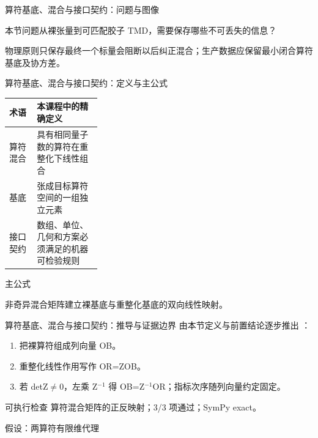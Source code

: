 \begin{frame}[t]{算符基底、混合与接口契约：问题与图像}
\footnotesize
\begin{block}{本节问题}从裸张量到可匹配胶子 TMD，需要保存哪些不可丢失的信息？\end{block}
\begin{block}{物理原则}\quad 只保存最终一个标量会阻断以后纠正混合；生产数据应保留最小闭合算符基底及协方差。\end{block}
\end{frame}

\begin{frame}[t]{算符基底、混合与接口契约：定义与主公式}
\footnotesize\begin{tabularx}{\linewidth}{p{0.30\linewidth}Y}
\toprule 术语 & 本课程中的精确定义\\\midrule
{} 算符混合 & 具有相同量子数的算符在重整化下线性组合\\
 基底 & 张成目标算符空间的一组独立元素\\
 接口契约 & 数组、单位、几何和方案必须满足的机器可检验规则\\
\bottomrule\end{tabularx}\vspace{0.15cm}
\begin{block}{ 主公式}\centering{}\end{block}
非奇异混合矩阵建立裸基底与重整化基底的双向线性映射。
\end{frame}

\begin{frame}[t]{算符基底、混合与接口契约：推导与证据边界}
\footnotesize
{}\quad 由本节定义与前置结论逐步推出 ：
\begin{enumerate}
\item 把裸算符组成列向量 OB。
\item 重整化线性作用写作 OR=ZOB。
\item 若 detZ\ensuremath{\ne}0，左乘 Z\ensuremath{^{-1}} 得 OB=Z\ensuremath{^{-1}}OR；指标次序随列向量约定固定。
\end{enumerate}\begin{block}{可执行检查}
\quad 算符混合矩阵的正反映射；3/3 项通过；SymPy exact。
\par\scriptsize 假设：两算符有限维代理
\end{block}
\end{frame}

